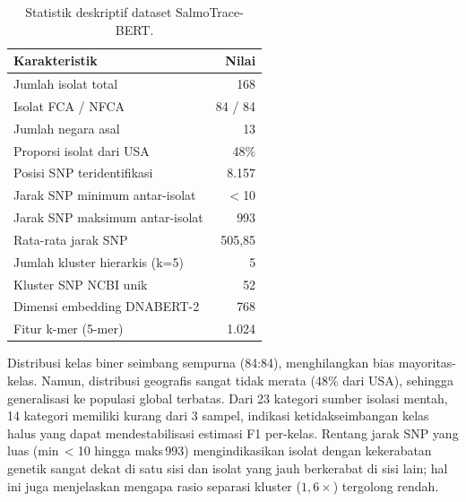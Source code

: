 \documentclass{article}
\begin{document}
\begin{table}[ht]
  \caption{Statistik deskriptif dataset SalmoTrace-BERT.}
  \label{tab:eda}
  \begin{center}
    \begin{small}
      \begin{tabular}{lr}
        \toprule
        Karakteristik                        & Nilai         \\
        \midrule
        Jumlah isolat total                  & 168           \\
        Isolat FCA / NFCA                    & 84 / 84       \\
        Jumlah negara asal                   & 13            \\
        Proporsi isolat dari USA             & 48\%          \\
        Posisi SNP teridentifikasi           & 8.157         \\
        Jarak SNP minimum antar-isolat       & $<$10         \\
        Jarak SNP maksimum antar-isolat      & 993           \\
        Rata-rata jarak SNP                  & 505,85        \\
        Jumlah kluster hierarkis (k=5)       & 5             \\
        Kluster SNP NCBI unik                & 52            \\
        Dimensi embedding DNABERT-2          & 768           \\
        Fitur k-mer (5-mer)                  & 1.024         \\
        \bottomrule
      \end{tabular}
    \end{small}
  \end{center}
  \vskip -0.1in
\end{table}

Distribusi kelas biner seimbang sempurna (84:84), menghilangkan bias
mayoritas-kelas. Namun, distribusi geografis sangat tidak merata (48\% dari
USA), sehingga generalisasi ke populasi global terbatas. Dari 23 kategori
sumber isolasi mentah, 14 kategori memiliki kurang dari 3 sampel, indikasi
ketidakseimbangan kelas halus yang dapat mendestabilisasi estimasi F1
per-kelas. Rentang jarak SNP yang luas (min\,$<$10 hingga maks\,993)
mengindikasikan isolat dengan kekerabatan genetik sangat dekat di satu sisi
dan isolat yang jauh berkerabat di sisi lain; hal ini juga menjelaskan
mengapa rasio separasi kluster ($1{,}6\times$) tergolong rendah.
\end{document}
